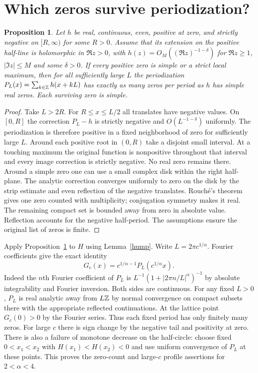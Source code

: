 \documentclass[11pt]{article}
\theoremstyle{plain}\newtheorem{theorem}{Theorem}[section]\newtheorem{lemma}[theorem]{Lemma}\newtheorem{corollary}[theorem]{Corollary}\newtheorem{proposition}[theorem]{Proposition}
\numberwithin{equation}{section}
\begin{document}
\section{Which zeros survive periodization?}\label{sec:images}
\begin{proposition}\label{images}
Let $h$ be real, continuous, even, positive at zero, and strictly negative on $[R,\infty)$ for some $R>0$. Assume that its extension on the positive half-line is holomorphic in $\Re z>0$, with $h(z)=O_M((\Re z)^{-1-\delta})$ for $\Re z\ge1$, $|\Im z|\le M$ and some $\delta>0$. If every positive zero is simple or a strict local maximum, then for all sufficiently large $L$ the periodization $P_L(x)=\sum_{k\in\mathbb Z}h(x+kL)$ has exactly as many zeros per period as $h$ has simple real zeros. Each surviving zero is simple.
\end{proposition}
\begin{proof}
Take $L>2R$. For $R\le x\le L/2$ all translates have negative values. On $[0,R]$ the correction $P_L-h$ is strictly negative and $O(L^{-1-\delta})$ uniformly. The periodization is therefore positive in a fixed neighborhood of zero for sufficiently large $L$. Around each positive root in $(0,R)$ take a disjoint small interval. At a touching maximum the original function is nonpositive throughout that interval and every image correction is strictly negative. No real zero remains there. Around a simple zero one can use a small complex disk within the right half-plane. The analytic correction converges uniformly to zero on the disk by the strip estimate and even reflection of the negative translates. Rouch\'e's theorem gives one zero counted with multiplicity; conjugation symmetry makes it real. The remaining compact set is bounded away from zero in absolute value. Reflection accounts for the negative half-period. The assumptions ensure the original list of zeros is finite.
\end{proof}
Apply Proposition~\ref{images} to $H$ using Lemma~\ref{hump}. Write $L=2\pi c^{1/\alpha}$. Fourier coefficients give the exact identity
\begin{equation}\label{period}
              G_c(x)=c^{1/\alpha-1} P_L(c^{1/\alpha}x).
\end{equation}
Indeed the $n$th Fourier coefficient of $P_L$ is $L^{-1}(1+|2\pi n/L|^\alpha)^{-1}$ by absolute integrability and Fourier inversion. Both sides are continuous. For any fixed $L>0$, $P_L$ is real analytic away from $L\mathbb Z$ by normal convergence on compact subsets there with the appropriate reflected continuations. At the lattice point $G_c(0)>0$ by the Fourier series. Thus each fixed period has only finitely many zeros. For large $c$ there is sign change by the negative tail and positivity at zero. There is also a failure of monotone decrease on the half-circle: choose fixed $0<x_1<x_2$ with $H(x_1)<H(x_2)<0$ and use uniform convergence of $P_L$ at these points. This proves the zero-count and large-$c$ profile assertions for $2<\alpha<4$.
\end{document}
